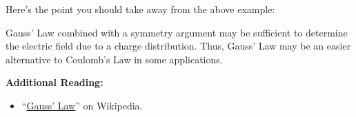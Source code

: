 
Here's the point you should take away from the above example:
%
\begin{mdframed}[backgroundcolor=yellow!20,nobreak=true] 
Gauss' Law combined with a symmetry argument may be sufficient to determine the electric field due to a charge distribution.
Thus, Gauss' Law may be an easier alternative to Coulomb's Law 
in some applications.
\end{mdframed}


{\bf Additional Reading:}
\begin{itemize}
\item ``\href{https://en.wikipedia.org/wiki/Gauss'_law}{Gauss' Law}'' on Wikipedia.
\end{itemize}

